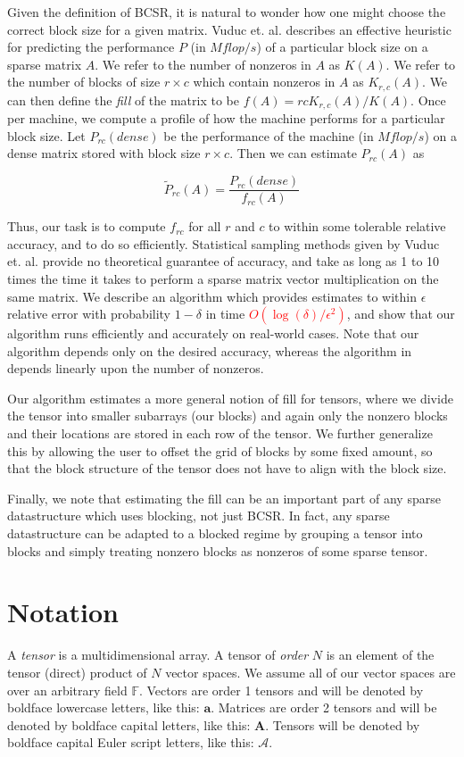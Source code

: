 \documentclass[12pt]{article}
\newcommand{\todo}[1] {\textbf{\textcolor{red}{#1}}}
\renewcommand{\vec}[1] {\mathbf{#1}}
\newcommand{\Mat}[1] {\mathbf{#1}}
\newcommand{\Ten}[1] {\mathbf{\mathcal{#1}}}
\newcommand{\F} {\mathbb{F}}
\begin{document}
  Given the definition of BCSR, it is natural to wonder how one might choose the correct block size for a given matrix.
  Vuduc et. al. describes an effective heuristic for predicting the performance $P$ (in $Mflop/s$) of a particular block size on a sparse matrix $A$.
  We refer to the number of nonzeros in $A$ as $K(A)$. We refer to the number of blocks of size $r \times c$ which contain nonzeros in $A$ as $K_{r, c}(A)$.
  We can then define the \textit{fill} of the matrix to be $f(A) = rcK_{r, c}(A)/K(A)$.
  Once per machine, we compute a profile of how the machine performs for a particular block size.
  Let $P_{rc}(dense)$ be the performance of the machine (in $Mflop/s$) on a dense matrix stored with block size $r \times c$.
  Then we can estimate $P_{rc}(A)$ as

  \[
    \tilde{P}_{rc}(A) = \frac{P_{rc}(dense)}{f_{rc}(A)}
  \]

  Thus, our task is to compute $f_{rc}$ for all $r$ and $c$ to within some tolerable relative accuracy, and to do so efficiently. Statistical sampling methods given by Vuduc et. al. provide no theoretical guarantee of accuracy, and take as long as 1 to 10 times the time it takes to perform a sparse matrix vector multiplication on the same matrix. We describe an algorithm which provides estimates to within $\epsilon$ relative error with probability $1 - \delta$ in time \todo{$O(\log(\delta)/\epsilon^2)$}, and show that our algorithm runs efficiently and accurately on real-world cases. Note that our algorithm depends only on the desired accuracy, whereas the algorithm in \cite{vuduc2003} depends linearly upon the number of nonzeros.

  Our algorithm estimates a more general notion of fill for tensors, where we divide the tensor into smaller subarrays (our blocks) and again only the nonzero blocks and their locations are stored in each row of the tensor. We further generalize this by allowing the user to offset the grid of blocks by some fixed amount, so that the block structure of the tensor does not have to align with the block size.

  Finally, we note that estimating the fill can be an important part of any sparse datastructure which uses blocking, not just BCSR. In fact, any sparse datastructure can be adapted to a blocked regime by grouping a tensor into blocks and simply treating nonzero blocks as nonzeros of some sparse tensor.

  \section{Notation}
    A \textit{tensor} is a multidimensional array. A tensor of \textit{order} $N$ is an element of the tensor (direct) product of $N$ vector spaces. We assume all of our vector spaces are over an arbitrary field $\F$. Vectors are order 1 tensors and will be denoted by boldface lowercase letters, like this: $\vec{a}$. Matrices are order 2 tensors and will be denoted by boldface capital letters, like this: $\Mat{A}$. Tensors will be denoted by boldface capital Euler script letters, like this: $\Ten{A}$.
\end{document}
